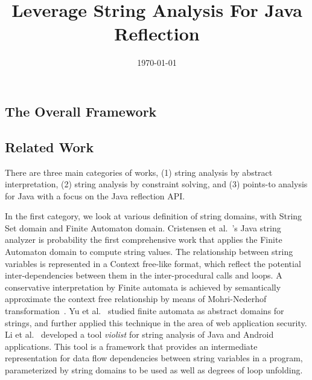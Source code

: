\documentclass{llncs}
\title{Leverage String Analysis For Java Reflection}
\author{\today}
\institute{Jinan University}
\begin{document}
\maketitle

\newcommand\Loc{\mathcal{L}}
\newcommand\Var{\mathcal{V}}
\newcommand\Label{\Phi}
\newcommand\set[1]{\{#1\}}
\newcommand\power{\mathcal{P}}
\newcommand\join{\cup}
\newcommand\subtype{\subseteq}

\subsection*{The Overall Framework}




\subsection*{Related Work}

There are three main categories of works, (1) string analysis by abstract interpretation, (2) string analysis by constraint solving, and (3) points-to analysis for Java with a focus on the Java reflection API.

In the first category, we look at various definition of string domains, with String Set domain and Finite Automaton domain. Cristensen et al.~\cite{Christensen03}'s Java string analyzer is probability the first comprehensive work that applies the Finite Automaton domain to compute string values. The relationship between string variables is represented in a Context free-like format, which reflect the potential inter-dependencies between them in the inter-procedural calls and loops. A conservative interpretation by Finite automata is achieved by semantically approximate the context free relationship by means of Mohri-Nederhof transformation~\cite{MN01}. Yu et al.~\cite{Yu11,YSLCWB16,Wang16} studied finite automata as abstract domains for strings, and further applied this technique in the area of web application security. Li et al.~\cite{LLMW015} developed a tool \emph{violist} for string analysis of Java and Android applications. This tool is a framework that provides an intermediate representation for data flow dependencies between string variables in a program, parameterized by string domains to be used as well as degrees of loop unfolding.
\end{document}
